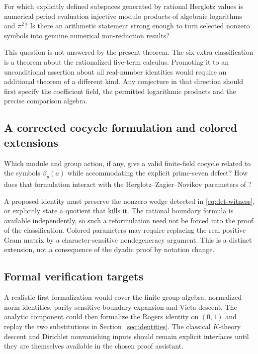 \begin{question}\label{question:periods}
For which explicitly defined subspaces generated by rational Herglotz
values is numerical period evaluation injective modulo products of
algebraic logarithms and $\pi^2$? Is there an arithmetic statement
strong enough to turn selected nonzero symbols into genuine numerical
non-reduction results?
\end{question}

This question is not answered by the present theorem. The six-extra
classification is a theorem about the rationalized five-term calculus.
Promoting it to an unconditional assertion about all real-number
identities would require an additional theorem of a different kind.
Any conjecture in that direction should first specify the coefficient
field, the permitted logarithmic products and the precise comparison
algebra.

\subsection{A corrected cocycle formulation and colored extensions}

\begin{question}\label{question:cocycle}
Which module and group action, if any, give a valid finite-field cocycle
related to the symbols $\beta_p(a)$ while accommodating the explicit
prime-seven defect? How does that formulation interact with the
Herglotz--Zagier--Novikov parameters of \cite{CK}?
\end{question}

A proposed identity must preserve the nonzero wedge detected in
\eqref{eq:det-witness}, or explicitly state a quotient that kills it.
The rational boundary formula is available independently, so such a
reformulation need not be forced into the proof of the classification.
Colored parameters may require replacing the real positive Gram matrix
by a character-sensitive nondegeneracy argument. This is a distinct
extension, not a consequence of the dyadic proof by notation change.

\subsection{Formal verification targets}

A realistic first formalization would cover the finite group algebra,
normalized norm identities, parity-sensitive boundary expansion and
Vieta descent. The analytic component could then formalize the Rogers
identity on $(0,1)$ and replay the two substitutions in
Section~\ref{sec:identities}. The classical $K$-theory descent and
Dirichlet nonvanishing inputs should remain explicit interfaces until
they are themselves available in the chosen proof assistant.

